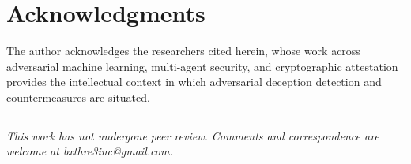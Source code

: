 \documentclass[12pt]{article}
\begin{document}
\section*{Acknowledgments}

The author acknowledges the researchers cited herein, whose work across adversarial machine learning, multi-agent security, and cryptographic attestation provides the intellectual context in which adversarial deception detection and countermeasures are situated.




\vspace{2em}
\hrule
\vspace{0.5em}
\noindent\small\textit{This work has not undergone peer review. Comments and correspondence are welcome at bxthre3inc@gmail.com.}
\end{document}
